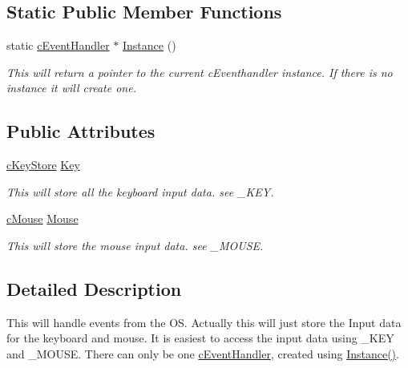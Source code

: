 \subsection*{Static Public Member Functions}
\begin{DoxyCompactItemize}
\item 
static \hyperlink{classc_event_handler}{cEventHandler} $\ast$ \hyperlink{classc_event_handler_a5a3b7fc02b0cadeb1f79ecb27aa580cb}{Instance} ()
\begin{DoxyCompactList}\small\item\em This will return a pointer to the current cEventhandler instance. If there is no instance it will create one. \item\end{DoxyCompactList}\end{DoxyCompactItemize}
\subsection*{Public Attributes}
\begin{DoxyCompactItemize}
\item 
\hyperlink{classc_key_store}{cKeyStore} \hyperlink{classc_event_handler_a53ba15cada383fb64c9918d8ce923585}{Key}
\begin{DoxyCompactList}\small\item\em This will store all the keyboard input data. see \_\-KEY. \item\end{DoxyCompactList}\item 
\hyperlink{classc_mouse}{cMouse} \hyperlink{classc_event_handler_acbb3c5ace9917c879a15ff524cd5c71c}{Mouse}
\begin{DoxyCompactList}\small\item\em This will store the mouse input data. see \_\-MOUSE. \item\end{DoxyCompactList}\end{DoxyCompactItemize}


\subsection{Detailed Description}
This will handle events from the OS. Actually this will just store the Input data for the keyboard and mouse. It is easiest to access the input data using \_\-KEY and \_\-MOUSE. There can only be one \hyperlink{classc_event_handler}{cEventHandler}, created using \hyperlink{classc_event_handler_a5a3b7fc02b0cadeb1f79ecb27aa580cb}{Instance()}. 

